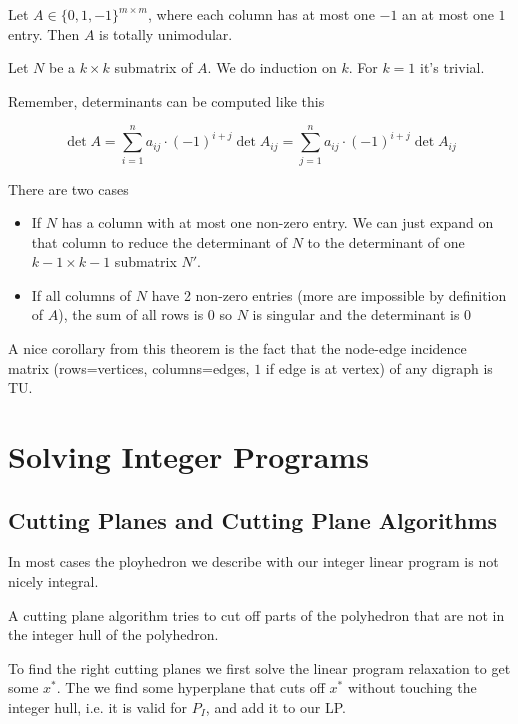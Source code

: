 \begin{thm} Let $A\in \{0,1,-1\}^{m\times m}$, where each column has at most one $-1$ an at most one $1$ entry. Then $A$ is totally unimodular.
\end{thm}

\begin{pr} Let $N$ be a $k\times k$ submatrix of $A$. We do induction on $k$. For $k=1$ it's trivial.

Remember, determinants can be computed like this

\[\det A = \sum_{i=1}^n a_{ij} \cdot (-1)^{i+j} \det A_{ij} = \sum_{j=1}^n a_{ij} \cdot (-1)^{i+j} \det A_{ij}\]

There are two cases

\begin{itemize}
\item If $N$ has a column with at most one non-zero entry. We can just expand on that column to reduce the determinant of $N$ to the determinant of one $k-1\times k-1$ submatrix $N'$.

\item If all columns of $N$ have 2 non-zero entries (more are impossible by definition of $A$), the sum of all rows is $0$ so $N$ is singular and the determinant is $0$
\end{itemize}
\end{pr}

A nice corollary from this theorem is the fact that the node-edge incidence matrix (rows=vertices, columns=edges, $1$ if edge is at vertex) of any digraph is TU.

\chapter{Solving Integer Programs}
\section{Cutting Planes and Cutting Plane Algorithms}
In most cases the ployhedron we describe with our integer linear program is not nicely integral.

A cutting plane algorithm tries to cut off parts of the polyhedron that are not in the integer hull of the polyhedron.

To find the right cutting planes we first solve the linear program relaxation to get some $x^*$. The we find some hyperplane that cuts off $x^*$ without touching the integer hull, i.e. it is valid for $P_I$, and add it to our LP.

